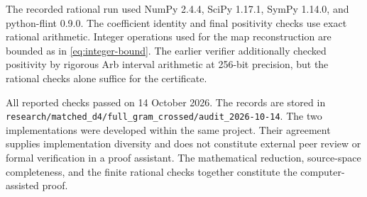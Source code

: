 \documentclass[aps,pra,reprint,superscriptaddress,amsmath,amssymb,floatfix,nofootinbib]{revtex4-2}
\begin{document}
The recorded rational run used NumPy 2.4.4, SciPy 1.17.1, SymPy 1.14.0,
and python-flint 0.9.0.
The coefficient identity and final positivity checks use exact rational
arithmetic. Integer operations used for the map reconstruction are
bounded as in \cref{eq:integer-bound}.
The earlier verifier additionally checked positivity by rigorous Arb
interval arithmetic at 256-bit precision, but the rational checks alone
suffice for the certificate.

All reported checks passed on 14 October 2026.
The records are stored in
\nolinkurl{research/matched_d4/full_gram_crossed/audit_2026-10-14}.
The two implementations were developed within the same project.
Their agreement supplies implementation diversity and does not constitute
external peer review or formal verification in a proof assistant.
The mathematical reduction, source-space completeness, and the finite
rational checks together constitute the computer-assisted proof.
\end{document}
